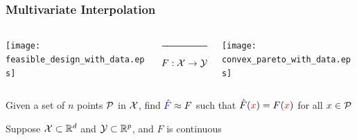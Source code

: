 \documentclass[aspectratio=169]{beamer}
\begin{document}
\begin{frame}\frametitle{Multivariate Interpolation}
\begin{columns}
\begin{column}{.35\textwidth}
\texttt{[image: feasible\_design\_with\_data.eps]}
\end{column}
\begin{column}{.2\textwidth}
\begin{center}
$\xrightarrow{\hspace*{2cm}}$
$$
F : {\cal X} \rightarrow {\cal Y}
$$
\end{center}
\end{column}
\begin{column}{.35\textwidth}
\texttt{[image: convex\_pareto\_with\_data.eps]}
\end{column}
\end{columns}

\pause
\bigskip

{\large Given a set of $n$ points {\color{red} ${\cal P}$} in ${\cal X}$,
find
${\color{blue} {\hat F}} \approx F$ such that ${\hat F}({\color{red} x}) = F({\color{red} x})$ for all
{\color{red}$x\in{\cal P}$}}

\pause
\bigskip

{\large Suppose ${\cal X} \subset \mathbb{R}^d$ and
${\cal Y} \subset \mathbb{R}^p$, and $F$ is continuous
}

\end{frame}
\end{document}
